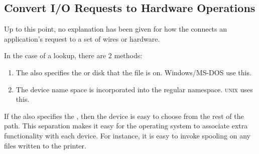 \subsection{Convert I/O Requests to Hardware Operations}\label{subsec:Convert_IO_Requests_HW_Ops}
Up to this point, no explanation has been given for how the  connects an application's request to a set of wires or hardware.

In the case of a  lookup, there are 2 methods:
\begin{enumerate}[noitemsep]
\item The  also specifies the  or disk that the file is on.
  Windows/MS-DOS use this.
\item The device name space is incorporated into the regular  namespace.
  \textsc{unix} uses this.
\end{enumerate}

If the  also specifies the , then the device is easy to choose from the rest of the path.
This separation makes it easy for the operating system to associate extra functionality with each device.
For instance, it is easy to invoke spooling on any files written to the printer.


